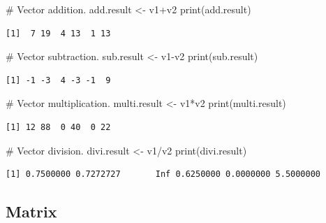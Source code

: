 \documentclass[
  letterpaper,
  DIV=11,
  numbers=noendperiod]{scrreprt}
\newenvironment{Shaded}{\begin{snugshade}}{\end{snugshade}}
\newcommand{\CommentTok}[1]{\textcolor[rgb]{0.37,0.37,0.37}{#1}}
\newcommand{\FunctionTok}[1]{\textcolor[rgb]{0.28,0.35,0.67}{#1}}
\newcommand{\NormalTok}[1]{\textcolor[rgb]{0.00,0.23,0.31}{#1}}
\newcommand{\OtherTok}[1]{\textcolor[rgb]{0.00,0.23,0.31}{#1}}
\newcommand{\SpecialCharTok}[1]{\textcolor[rgb]{0.37,0.37,0.37}{#1}}
\begin{document}
\begin{Shaded}
\begin{Highlighting}[]
\CommentTok{\# Vector addition.}
\NormalTok{add.result }\OtherTok{\textless{}{-}}\NormalTok{ v1}\SpecialCharTok{+}\NormalTok{v2}
\FunctionTok{print}\NormalTok{(add.result)}
\end{Highlighting}
\end{Shaded}

\begin{verbatim}
[1]  7 19  4 13  1 13
\end{verbatim}

\begin{Shaded}
\begin{Highlighting}[]
\CommentTok{\# Vector subtraction.}
\NormalTok{sub.result }\OtherTok{\textless{}{-}}\NormalTok{ v1}\SpecialCharTok{{-}}\NormalTok{v2}
\FunctionTok{print}\NormalTok{(sub.result)}
\end{Highlighting}
\end{Shaded}

\begin{verbatim}
[1] -1 -3  4 -3 -1  9
\end{verbatim}

\begin{Shaded}
\begin{Highlighting}[]
\CommentTok{\# Vector multiplication.}
\NormalTok{multi.result }\OtherTok{\textless{}{-}}\NormalTok{ v1}\SpecialCharTok{*}\NormalTok{v2}
\FunctionTok{print}\NormalTok{(multi.result)}
\end{Highlighting}
\end{Shaded}

\begin{verbatim}
[1] 12 88  0 40  0 22
\end{verbatim}

\begin{Shaded}
\begin{Highlighting}[]
\CommentTok{\# Vector division.}
\NormalTok{divi.result }\OtherTok{\textless{}{-}}\NormalTok{ v1}\SpecialCharTok{/}\NormalTok{v2}
\FunctionTok{print}\NormalTok{(divi.result)}
\end{Highlighting}
\end{Shaded}

\begin{verbatim}
[1] 0.7500000 0.7272727       Inf 0.6250000 0.0000000 5.5000000
\end{verbatim}

\hypertarget{matrix}{%
\subsection{Matrix}\label{matrix}}
\end{document}
